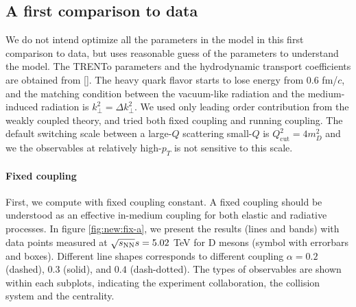 \subsection{A first comparison to data}
We do not intend optimize all the parameters in the model in this first comparison to data, but uses reasonable guess of the parameters to understand the model.
The TRENTo parameters and the hydrodynamic transport coefficients are obtained from [].
The heavy quark flavor starts to lose energy from $0.6$ fm/$c$, and the matching condition between the vacuum-like radiation and the medium-induced radiation is $k_\perp^2 = \Delta k_\perp^2$.
We used only leading order contribution from the weakly coupled theory, and tried both fixed coupling and running coupling.
The default switching scale between a large-$Q$ scattering small-$Q$ is $Q_{\textrm{cut}}^2 = 4 m_D^2$ and we the observables at relatively high-$p_T$ is not sensitive to this scale.

\paragraph{Fixed coupling} First, we compute with fixed coupling constant.
A fixed coupling should be understood as an effective in-medium coupling for both elastic and radiative processes.
In figure \ref{fig:new:fix-a}, we present the results (lines and bands) with data points measured at $\sqrt{s_\mathrm{NN}}{s} = 5.02$ TeV for D mesons (symbol with errorbars and boxes).
Different line shapes corresponds to different coupling $\alpha=0.2$ (dashed), $0.3$ (solid), and $0.4$ (dash-dotted). 
The types of observables are shown within each subplots, indicating the experiment collaboration, the collision system and the centrality.

